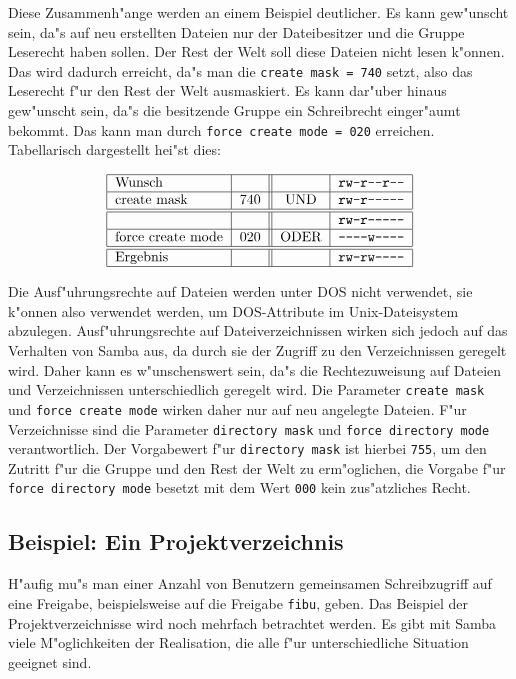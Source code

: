 \documentclass{scrartcl}\usepackage{pslatex}\typearea{12}
\newcommand{\param}{\texttt}
\begin{document}
Diese Zusammenh"ange werden an einem Beispiel deutlicher. Es kann
gew"unscht sein, da"s auf neu erstellten Dateien nur der
Dateibesitzer und die Gruppe Leserecht haben sollen. Der Rest der Welt
soll diese Dateien nicht lesen k"onnen. Das wird dadurch erreicht,
da"s man die \param{create mask = 740} setzt, also das Leserecht f"ur
den Rest der Welt ausmaskiert. Es kann dar"uber hinaus gew"unscht
sein, da"s die besitzende Gruppe ein Schreibrecht einger"aumt
bekommt. Das kann man durch \param{force create mode = 020} erreichen.
Tabellarisch dargestellt hei"st dies:

\[ \begin{tabular}{|l|l||c|l|}
\hline
Wunsch & & & \texttt{rw-r-{}-r-{}-} \\
\hline
create mask & 740 & UND & \texttt{rw-r-{}-{}-{}-{}-} \\
\hline
\hline
& & & \texttt{rw-r-{}-{}-{}-{}-} \\
\hline
force create mode & 020 & ODER & \texttt{-{}-{}-{}-w-{}-{}-{}-} \\
\hline
\hline
Ergebnis & & & \texttt{rw-rw-{}-{}-{}-} \\
\hline
\end{tabular} \]

Die Ausf"uhrungsrechte auf Dateien werden unter DOS nicht verwendet,
sie k"onnen also verwendet werden, um DOS-Attribute im
Unix-Dateisystem abzulegen. Ausf"uhrungsrechte auf Dateiverzeichnissen
wirken sich jedoch auf das Verhalten von Samba aus, da durch sie der
Zugriff zu den Verzeichnissen geregelt wird.  Daher kann es
w"unschenswert sein, da"s die Rechtezuweisung auf Dateien und
Verzeichnissen unterschiedlich geregelt wird. Die Parameter
\param{create mask} und \param{force create mode} wirken daher nur auf
neu angelegte Dateien.  F"ur Verzeichnisse sind die Parameter
\param{directory mask} und \param{force directory mode}
verantwortlich. Der Vorgabewert f"ur \param{directory mask} ist
hierbei \param{755}, um den Zutritt f"ur die Gruppe und den Rest der
Welt zu erm"oglichen, die Vorgabe f"ur \param{force directory mode}
besetzt mit dem Wert \param{000} kein zus"atzliches Recht.

\subsection{Beispiel: Ein Projektverzeichnis}

H"aufig mu"s man einer Anzahl von Benutzern gemeinsamen Schreibzugriff
auf eine Freigabe, beispielsweise auf die Freigabe \param{fibu},
geben. Das Beispiel der Projektverzeichnisse wird noch mehrfach
betrachtet werden. Es gibt mit Samba viele M"oglichkeiten der
Realisation, die alle f"ur unterschiedliche Situation geeignet sind.
\end{document}
